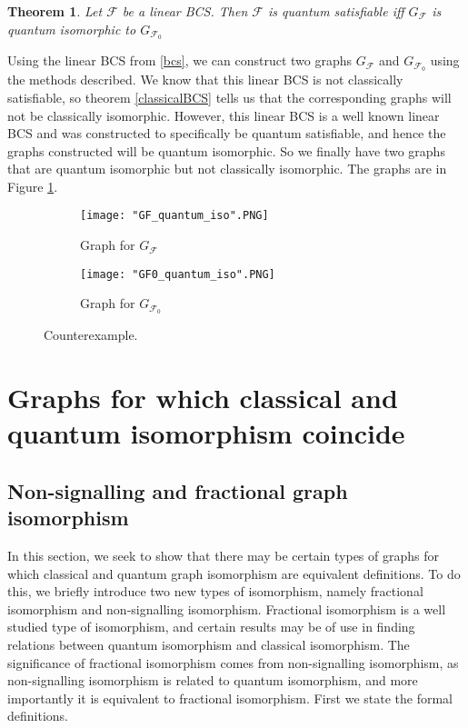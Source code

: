 \documentclass[12pt]{article}
\newtheorem{thm}{Theorem}[section]
\begin{document}
\begin{thm}
\label{quantumBCS}
Let $\mathcal{F}$ be a linear BCS. Then $\mathcal{F}$ is quantum satisfiable iff $G_{\mathcal{F}}$ is quantum isomorphic to $G_{\mathcal{F}_0}$
\end{thm}

Using the linear BCS from \ref{bcs}, we can construct two graphs $G_{\mathcal{F}}$ and $G_{\mathcal{F}_0}$ using the methods described. We know that this linear BCS is not classically satisfiable, so theorem \ref{classicalBCS} tells us that the corresponding graphs will not be classically isomorphic. However, this linear BCS is a well known linear BCS and was constructed to specifically be quantum satisfiable, and hence the graphs constructed will be quantum isomorphic. So we finally have two graphs that are quantum isomorphic but not classically isomorphic. The graphs are in Figure \ref{fig:qisoNOTiso}. 

\begin{figure}
\centering
  \begin{subfigure}[b]{0.4\textwidth}
    \texttt{[image: "GF\_quantum\_iso".PNG]}
    \caption{Graph for $G_{\mathcal{F}}$}
  \end{subfigure}
  \begin{subfigure}[b]{0.4\textwidth}
    \texttt{[image: "GF0\_quantum\_iso".PNG]}
    \caption{Graph for $G_{\mathcal{F}_0}$}
  \end{subfigure}
\caption{Counterexample.}
\label{fig:qisoNOTiso}
\end{figure}



\section{Graphs for which classical and quantum isomorphism coincide}
\subsection{Non-signalling and fractional graph isomorphism}
In this section, we seek to show that there may be certain types of graphs for which classical and quantum graph isomorphism are equivalent definitions. To do this, we briefly introduce two new types of isomorphism, namely fractional isomorphism and non-signalling isomorphism. Fractional isomorphism is a well studied type of isomorphism, and certain results may be of use in finding relations between quantum isomorphism and classical isomorphism. The significance of fractional isomorphism comes from non-signalling isomorphism, as non-signalling isomorphism is related to quantum isomorphism, and more importantly it is equivalent to fractional isomorphism. First we state the formal definitions.
\end{document}
